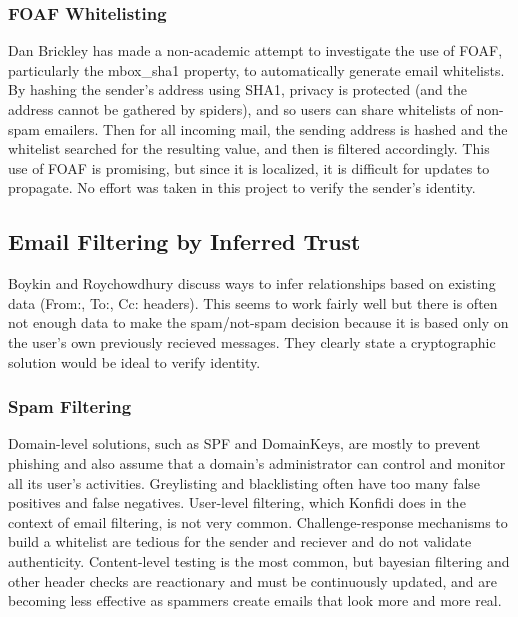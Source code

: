 \documentclass[onecolumn]{acm_proc_article-sp}
\begin{document}
\subsubsection{FOAF Whitelisting}
Dan Brickley has made a non-academic attempt to investigate the use of FOAF, particularly the mbox\_sha1 property, to automatically generate email whitelists. By hashing the sender's address using SHA1, privacy is protected (and the address cannot be gathered by spiders), and so users can share whitelists of non-spam emailers. Then for all incoming mail, the sending address is hashed and the whitelist searched for the resulting value, and then is filtered accordingly. This use of FOAF is promising, but since it is localized, it is difficult for updates to propagate\cite{foafWhitelisting}. No effort was taken in this project to verify the sender's identity.

\subsection{Email Filtering by Inferred Trust}
Boykin and Roychowdhury discuss ways to infer relationships based on existing data (From:, To:, Cc: headers)\cite{boykin04email}. This seems to work fairly well but there is often not enough data to make the spam/not-spam decision because it is based only on the user's own previously recieved messages. They clearly state a cryptographic solution would be ideal to verify identity.

\subsubsection{Spam Filtering}
Domain-level solutions, such as SPF and DomainKeys, are mostly to prevent phishing and also assume that a domain's administrator can control and monitor all its user's activities. Greylisting and blacklisting often have too many false positives and false negatives. User-level filtering, which Konfidi does in the context of email filtering, is not very common. Challenge-response mechanisms to build a whitelist are tedious for the sender and reciever and do not validate authenticity. Content-level testing is the most common, but bayesian filtering and other header checks are reactionary and must be continuously updated, and are becoming less effective as spammers create emails that look more and more real. 
\end{document}
